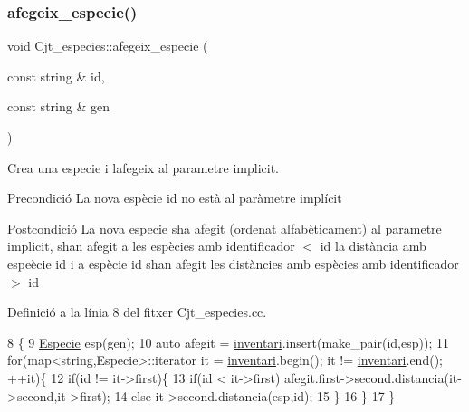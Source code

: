 \subsubsection{\texorpdfstring{afegeix\+\_\+especie()}{afegeix\_especie()}}
{\footnotesize\ttfamily void Cjt\+\_\+especies\+::afegeix\+\_\+especie (\begin{DoxyParamCaption}\item[{const string \&}]{id,  }\item[{const string \&}]{gen }\end{DoxyParamCaption})}



Crea una especie i l\textquotesingle{}afegeix al parametre implicit. 

\begin{DoxyPrecond}{Precondició}
La nova espècie id no està al paràmetre implícit 
\end{DoxyPrecond}
\begin{DoxyPostcond}{Postcondició}
La nova especie s\textquotesingle{}ha afegit (ordenat alfabèticament) al parametre implicit, s\textquotesingle{}han afegit a les espècies amb identificador $<$ id la distància amb espeècie id i a espècie id s\textquotesingle{}han afegit les distàncies amb espècies amb identificador $>$ id 
\end{DoxyPostcond}


Definició a la línia 8 del fitxer Cjt\+\_\+especies.\+cc.


\begin{DoxyCode}
8                                                                      \{
9     \hyperlink{class_especie}{Especie} esp(gen);
10     \textcolor{keyword}{auto} afegit = \hyperlink{class_cjt__especies_aa253bc335c8c8176b8ece5c49a15c5f3}{inventari}.insert(make\_pair(\textcolor{keywordtype}{id},esp));
11     \textcolor{keywordflow}{for}(map<string,Especie>::iterator it = \hyperlink{class_cjt__especies_aa253bc335c8c8176b8ece5c49a15c5f3}{inventari}.begin(); it != 
      \hyperlink{class_cjt__especies_aa253bc335c8c8176b8ece5c49a15c5f3}{inventari}.end(); ++it)\{
12         \textcolor{keywordflow}{if}(\textcolor{keywordtype}{id} != it->first)\{
13             \textcolor{keywordflow}{if}(id < it->first) afegit.first->second.distancia(it->second,it->first);
14             \textcolor{keywordflow}{else} it->second.distancia(esp,\textcolor{keywordtype}{id});
15         \}
16     \}
17 \}
\end{DoxyCode}
\mbox{\label{class_cjt__especies_a6de3583aff6835d743fc9493c7b38576}} 

